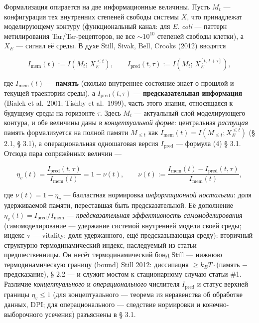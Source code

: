 \documentclass[pdflatex,sn-mathphys-ay]{sn-jnl}
\begin{document}
Формализация опирается на две информационные величины. Пусть \(M_t\) --- конфигурация тех внутренних степеней свободы системы \(X\), что принадлежат моделирующему контуру (функциональный канал: для \emph{E. coli} --- паттерн метилирования Tar/Tsr-рецепторов, не все \(\sim 10^{10}\) степеней свободы клетки), а \(X_E\) --- сигнал её среды. В духе Still, Sivak, Bell, Crooks (2012) вводятся



\[I_{\text{mem}}(t) := I\!\left(M_t;\, X_E^{\le t}\right), \qquad I_{\text{pred}}(t,\tau) := I\!\left(M_t;\, X_E^{[t,\,t+\tau]}\right),\]



где \(I_{\text{mem}}(t)\) --- \textbf{память} (сколько внутреннее состояние знает о прошлой и текущей траектории среды), а \(I_{\text{pred}}(t,\tau)\) --- \textbf{предсказательная информация} (Bialek et al.~2001; Tishby et al.~1999), часть этого знания, относящаяся к будущему среды на горизонте \(\tau\). Здесь \(M_t\) --- актуальный слой моделирующего контура, и обе величины даны в \emph{концептуальной форме}: центральная \emph{растущая} память формализуется на полной памяти \(M_{\le t}\) как \(I_{\text{mem}}(t) = I(M_{\le t}; X_E^{\le t})\) (§ 2.1, § 3.1), а операциональная одношаговая версия \(I_{\text{pred}}\) --- формула (4) § 3.1. Отсюда пара сопряжённых величин ---



\begin{equation}\eta_v(t) = \frac{I_{\text{pred}}(t,\tau)}{I_{\text{mem}}(t)} = 1 - \nu(t), \qquad \nu(t) := \frac{I_{\text{mem}}(t) - I_{\text{pred}}(t,\tau)}{I_{\text{mem}}(t)}, \tag{1}\end{equation}



где \(\nu(t) = 1 - \eta_v\) --- балластная нормировка \emph{информационной ностальгии}: доля удерживаемой памяти, переставшая быть предсказательной. Её дополнение \(\eta_v(t) = I_{\text{pred}}/I_{\text{mem}}\) --- \emph{предсказательная эффективность самомоделирования} (самомоделирование --- удержание системой внутренней модели своей среды; индекс v --- vitality; доля удержанного, ещё предсказывающая среду): вторичный структурно-термодинамический индекс, наследуемый из статьи-предшественницы. Он несёт термодинамический бонд Still --- нижнюю термодинамическую границу (bound) Still 2012: диссипация \(\ge k_B T\cdot\)(память \(-\) предсказание), § 2.2 --- и служит мостом к стационарному случаю статьи \#1. Различие \emph{концептуального} и \emph{операционального} числителя \(I_{\text{pred}}\) и статус верхней границы \(\eta_v \le 1\) (для концептуального --- теорема из неравенства об обработке данных, DPI; для операционального --- следствие нормировки и конечно-выборочного усечения) разъяснены в § 3.1.
\end{document}
